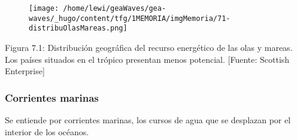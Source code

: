 \begin{figure}
\centering
\texttt{[image: /home/lewi/geaWaves/gea-waves/\_hugo/content/tfg/1MEMORIA/imgMemoria/71-distribuOlasMareas.png]}
\caption{}
\end{figure}

Figura 7.1: Distribución geográfica del recurso energético de las olas y
mareas. Los países situados en el trópico presentan menos potencial.
{[}Fuente: Scottish Enterprise{]}

\subsubsection{Corrientes marinas}\label{header-n28}

Se entiende por corrientes marinas, los cursos de agua que se desplazan
por el interior de los océanos.

